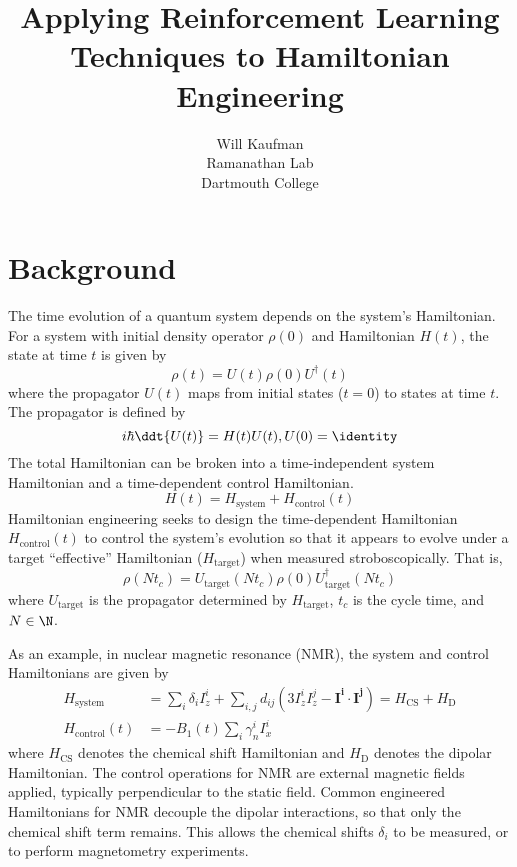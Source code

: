 \documentclass{article}
\title{Applying Reinforcement Learning Techniques to Hamiltonian Engineering}
\author{Will Kaufman \\ Ramanathan Lab \\ Dartmouth College}
\begin{document}
\maketitle

\section{Background}


The time evolution of a quantum system depends on the system's Hamiltonian. For a system with initial density operator $\rho(0)$ and Hamiltonian $H(t)$, the state at time $t$ is given by
\[
\rho(t) = U(t)\rho(0)U^\dagger(t)
\]
where the propagator $U(t)$ maps from initial states ($t=0$) to states at time $t$. The propagator is defined by
\begin{equation}
    i\hbar \ddt{U(t)} = H(t) U(t), U(0) = \identity
\end{equation}
The total Hamiltonian can be broken into a time-independent system Hamiltonian and a time-dependent control Hamiltonian.
\begin{equation}
    H(t) = H_\text{system} + H_\text{control}(t)
\end{equation}
Hamiltonian engineering seeks to design the time-dependent Hamiltonian $H_\text{control}(t)$ to control the system's evolution so that it appears to evolve under a target ``effective'' Hamiltonian ($H_\text{target}$) when measured stroboscopically. That is,
\begin{equation}\label{eq:strob_measure}
    \rho(Nt_c) = U_\text{target}(Nt_c) \rho(0) U_\text{target}^\dagger(Nt_c)
\end{equation}
where $U_\text{target}$ is the propagator determined by $H_\text{target}$, $t_c$ is the cycle time, and $N \in \N$.

As an example, in nuclear magnetic resonance (NMR), the system and control Hamiltonians are given by
\begin{align}\label{eq:ham_spin}
    H_\text{system} &= \sum_i \delta_i I_z^i + \sum_{i,j} d_{ij} \left( 3I_z^iI_z^j - \mathbf{I^i} \cdot \mathbf{I^j} \right)
    = H_\text{CS} + H_\text{D} \\
    H_\text{control}(t) &= -B_1(t) \sum_i \gamma_n^i I_x^i
\end{align}
where $H_\text{CS}$ denotes the chemical shift Hamiltonian and $H_\text{D}$ denotes the dipolar Hamiltonian.
The control operations for NMR are external magnetic fields applied, typically perpendicular to the static field.
Common engineered Hamiltonians for NMR decouple the dipolar interactions, so that only the chemical shift term remains. This allows the chemical shifts $\delta_i$ to be measured, or to perform magnetometry experiments.
\end{document}
